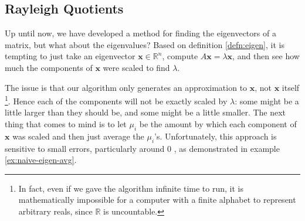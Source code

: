 \documentclass{article}
\let\vec\mathbf
\begin{document}
\subsection{Rayleigh Quotients}
Up until now, we have developed a method for finding the eigenvectors of a matrix, but what about the eigenvalues? Based on definition \ref{defn:eigen}, it is tempting to just take an eigenvector $\vec{x} \in \mathbb{R}^n$, compute $A\vec{x} = \lambda\vec{x}$, and then see how much the components of $\vec{x}$ were scaled to find $\lambda$.

The issue is that our algorithm only generates an approximation to $\vec{x}$, not $\vec{x}$ itself \footnote{In fact, even if we gave the algorithm infinite time to run, it is mathematically impossible for a computer with a finite alphabet to represent arbitrary reals, since $\mathbb{R}$ is uncountable.}. Hence each of the components will not be exactly scaled by $\lambda$: some might be a little larger than they should be, and some might be a little smaller. The next thing that comes to mind is to let $\mu_i$ be the amount by which each component of $\vec{x}$ was scaled and then just average the $\mu_i$'s. Unfortunately, this approach is sensitive to small errors, particularly around $0$ \cite{mit-sensitivity}, as demonstrated in example \ref{ex:naive-eigen-avg}.
\end{document}
